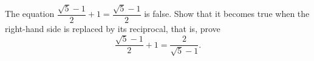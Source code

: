 The equation $\dfrac{\sqrt5-1}{2}+1=\dfrac{\sqrt5-1}{2}$ is false. Show that it becomes true when the right-hand side is replaced by its reciprocal, that is, prove
\[
\dfrac{\sqrt5-1}{2}+1=\dfrac{2}{\sqrt5-1}.
\]
